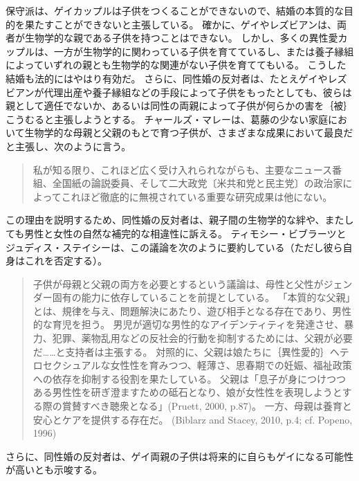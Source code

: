 \documentclass[paper=a4,book,openany]{jlreq}
\begin{document}
保守派は、ゲイカップルは子供をつくることができないので、結婚の本質的な目的を果たすことができないと主張している。
確かに、ゲイやレズビアンは、両者が生物学的な親である子供を持つことはできない。
しかし、多くの異性愛カップルは、一方が生物学的に関わっている子供を育てているし、または養子縁組によっていずれの親とも生物学的な関連がない子供を育ててもいる。
こうした結婚も法的にはやはり有効だ。
さらに、同性婚の反対者は、たとえゲイやレズビアンが代理出産や養子縁組などの手段によって子供をもったとしても、彼らは親として適任でないか、あるいは同性の両親によって子供が何らかの害を｛被｝{こうむ}ると主張しようとする。
チャールズ・マレーは、葛藤の少ない家庭において生物学的な母親と父親のもとで育つ子供が、さまざまな成果において最良だと主張し、次のように言う。

\begin{quote}
私が知る限り、これほど広く受け入れられながらも、主要なニュース番組、全国紙の論説委員、そして二大政党〔米共和党と民主党〕の政治家によってこれほど徹底的に無視されている重要な研究成果は他にない。
\citep[p.162]{murray12:_comin_apart}
\end{quote}

この理由を説明するため、同性婚の反対者は、親子間の生物学的な絆や、またしても男性と女性の自然な補完的な相違性に訴える。
ティモシー・ビブラーツとジュディス・ステイシーは、この議論を次のように要約している（ただし彼ら自身はこれを否定する）。

\begin{quote}
子供が母親と父親の両方を必要とするという議論は、母性と父性がジェンダー固有の能力に依存していることを前提としている。
「本質的な父親」とは、規律を与え、問題解決にあたり、遊び相手となる存在であり、男性的な育児を担う。
男児が適切な男性的なアイデンティティを発達させ、暴力、犯罪、薬物乱用などの反社会的行動を抑制するためには、父親が必要だ……と支持者は主張する。
対照的に、父親は娘たちに｛異性愛的｝{ヘテロセクシュアル}な女性性を育みつつ、軽薄さ、思春期での妊娠、福祉政策への依存を抑制する役割を果たしている。
父親は「息子が身につけつつある男性性を研ぎ澄ますための砥石となり、娘が女性性を表現しようとする際の賞賛すべき聴衆となる」(Pruett, 2000, p.87)。
一方、母親は養育と安心とケアを提供する存在だ。
(Biblarz and Stacey, 2010, p.4; cf. Popeno, 1996)
\nocite{biblarz10:_how_does_gender_paren_matter}\nocite{pruett00:_father}\nocite{popenoe96:_life_father}

\end{quote}

さらに、同性婚の反対者は、ゲイ両親の子供は将来的に自らもゲイになる可能性が高いとも示唆する。
\end{document}
